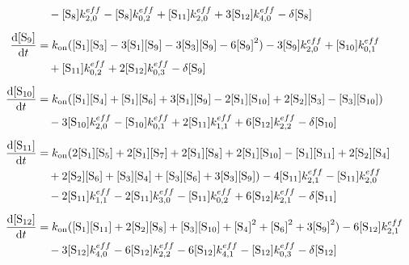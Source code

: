 \begin{align*}
 & \quad -\Conc{\species{8}}k^{eff}_{2,0}-\Conc{\species{8}}k^{eff}_{0,2}+\Conc{\species{11}}k^{eff}_{2,0}+3\Conc{\species{12}}k^{eff}_{4,0}-\delta\Conc{\species{8}}\\[0.5em]
\DCDtNoSpacing{\species{9}} &= \kon{}(\Conc{\species{1}}\Conc{\species{3}}-3\Conc{\species{1}}\Conc{\species{9}}-3\Conc{\species{3}}\Conc{\species{9}}-6\Conc{\species{9}}^2)-3\Conc{\species{9}}k^{eff}_{2,0}+\Conc{\species{10}}k^{eff}_{0,1}\\
 & \quad +\Conc{\species{11}}k^{eff}_{0,2}+2\Conc{\species{12}}k^{eff}_{0,3}-\delta\Conc{\species{9}}\\[0.5em]
\DCDtNoSpacing{\species{10}} &= \kon{}(\Conc{\species{1}}\Conc{\species{4}}+\Conc{\species{1}}\Conc{\species{6}}+3\Conc{\species{1}}\Conc{\species{9}}-2\Conc{\species{1}}\Conc{\species{10}}+2\Conc{\species{2}}\Conc{\species{3}}-\Conc{\species{3}}\Conc{\species{10}}) \\
 & \quad -3\Conc{\species{10}}k^{eff}_{2,0}-\Conc{\species{10}}k^{eff}_{0,1}+2\Conc{\species{11}}k^{eff}_{1,1}+6\Conc{\species{12}}k^{eff}_{2,2}-\delta\Conc{\species{10}}\\[0.5em]
\DCDtNoSpacing{\species{11}} &= \kon{}(2\Conc{\species{1}}\Conc{\species{5}}+2\Conc{\species{1}}\Conc{\species{7}}+2\Conc{\species{1}}\Conc{\species{8}}+2\Conc{\species{1}}\Conc{\species{10}}-\Conc{\species{1}}\Conc{\species{11}}+2\Conc{\species{2}}\Conc{\species{4}}\\
 & \quad +2\Conc{\species{2}}\Conc{\species{6}}+\Conc{\species{3}}\Conc{\species{4}}+\Conc{\species{3}}\Conc{\species{6}}+3\Conc{\species{3}}\Conc{\species{9}})-4\Conc{\species{11}}k^{eff}_{2,1}-\Conc{\species{11}}k^{eff}_{2,0}\\
 & \quad -2\Conc{\species{11}}k^{eff}_{1,1}-2\Conc{\species{11}}k^{eff}_{3,0}-\Conc{\species{11}}k^{eff}_{0,2}+6\Conc{\species{12}}k^{eff}_{2,1}-\delta\Conc{\species{11}}\\[0.5em]
\DCDtNoSpacing{\species{12}} &= \kon{}(\Conc{\species{1}}\Conc{\species{11}}+2\Conc{\species{2}}\Conc{\species{8}}+\Conc{\species{3}}\Conc{\species{10}}+\Conc{\species{4}}^2+\Conc{\species{6}}^2+3\Conc{\species{9}}^2)-6\Conc{\species{12}}k^{eff}_{2,1}\\
 & \quad -3\Conc{\species{12}}k^{eff}_{4,0}-6\Conc{\species{12}}k^{eff}_{2,2}-6\Conc{\species{12}}k^{eff}_{4,1}-\Conc{\species{12}}k^{eff}_{0,3}-\delta\Conc{\species{12}}\\[0.5em]
\end{align*}